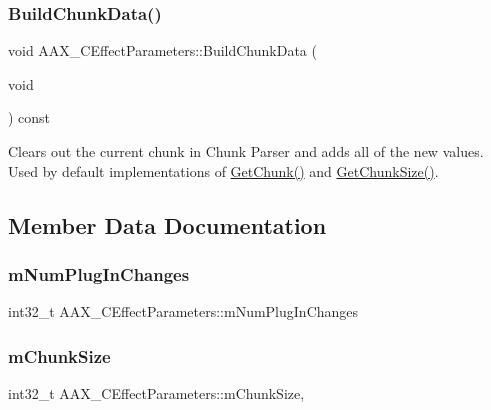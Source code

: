 \subsubsection{\texorpdfstring{BuildChunkData()}{BuildChunkData()}}
{\footnotesize\ttfamily void A\+A\+X\+\_\+\+C\+Effect\+Parameters\+::\+Build\+Chunk\+Data (\begin{DoxyParamCaption}\item[{void}]{ }\end{DoxyParamCaption}) const\hspace{0.3cm}{\ttfamily [protected]}}



Clears out the current chunk in Chunk Parser and adds all of the new values. Used by default implementations of \mbox{\hyperlink{a01481_aeddfa6e0b92f9373836ae41491114c4d}{Get\+Chunk()}} and \mbox{\hyperlink{a01481_aade2d4ba2fcb8c302917caf4bfb0f8cf}{Get\+Chunk\+Size()}}. 



\subsection{Member Data Documentation}
\mbox{\label{a01481_a1d9f79117c9075f47b00a7af34113b22}} 
\subsubsection{\texorpdfstring{mNumPlugInChanges}{mNumPlugInChanges}}
{\footnotesize\ttfamily int32\+\_\+t A\+A\+X\+\_\+\+C\+Effect\+Parameters\+::m\+Num\+Plug\+In\+Changes\hspace{0.3cm}{\ttfamily [protected]}}

\mbox{\label{a01481_a8c792ec58dc073534348004f0c0c09dd}} 
\subsubsection{\texorpdfstring{mChunkSize}{mChunkSize}}
{\footnotesize\ttfamily int32\+\_\+t A\+A\+X\+\_\+\+C\+Effect\+Parameters\+::m\+Chunk\+Size\hspace{0.3cm}{\ttfamily [mutable]}, {\ttfamily [protected]}}

